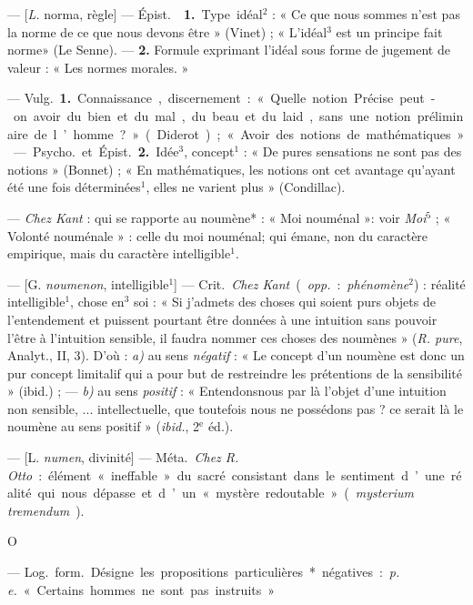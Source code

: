\begin{itemize}[leftmargin=1cm, label=, itemsep=1pt]
 — [{\it L.} norma, règle] — \si{Épist.}  {\bf 1.}
Type idéal$^2$ : « Ce que nous sommes n’est pas la norme de ce que nous
devons être » (Vinet) ; « L'idéal$^3$ est un principe fait norme» (Le Senne).
—  {\bf 2.} Formule exprimant l'idéal sous forme de jugement
de valeur : « Les normes morales. »

 — \si{Vulg.} {\bf 1.} Connaissance, discernement : « Quelle
notion Précise peut-on avoir du bien et du mal, du beau et du laid, ... sans
une notion préliminaire de l’homme ? » (Diderot) ; « Avoir des notions de
mathématiques. »

— \si{Psycho.} et \si{Épist.} {\bf 2.} Idée$^3$, concept$^1$ : « De pures
sensations ne sont pas des notions » (Bonnet) ; « En mathématiques, les
notions ont cet avantage qu'ayant été une fois déterminées$^1$, elles ne
varient plus » (Condillac).

 — {\it Chez Kant} : qui se rapporte au noumène* : « Moi
nouménal »: voir {\it Moi}$^5$ ; « Volonté nouménale » : celle du moi
nouménal; qui émane, non du caractère empirique, mais du caractère
intelligible$^1$.

 — [G. {\it noumenon}, intelligible$^1$] — \si{Crit.} {\it Chez
Kant} ({\it opp.} : {\it phénomène}$^2$) : réalité intelligible$^1$, chose
%
en$^3$ soi : « Si j’admets des choses qui soient purs objets de l’entendement
et puissent pourtant être données à une intuition sans pouvoir l'être à
l'intuition sensible, il faudra nommer ces choses des noumènes » ({\it R.
pure}, Analyt., II, 3). D'où : {\it a)} au sens {\it négatif} : « Le concept
d’un noumène est donc un pur concept limitalif qui a pour but de restreindre
les prétentions de la sensibilité » (ibid.) ; — {\it b)} au sens
{\it positif} : « Entendonsnous par là l’objet d’une intuition non
sensible, ... intellectuelle, que toutefois nous ne possédons pas ? ce serait
là le noumène au sens positif » ({\it ibid.}, 2$^\text{e}$ éd.).

 — [L. {\it numen}, divinité] — \si{Méta.} {\it Chez R. Otto} :
élément « ineffable » du sacré consistant dans le sentiment d’une réalité qui
nous dépasse et d’un « mystère redoutable » ({\it mysterium tremendum}).

\begin{center}
O
\end{center}

 — \si{Log.} \si{form.} Désigne les propositions particulières*
négatives : {\it p. e.} « Certains hommes ne sont pas instruits. »


\end{itemize}
